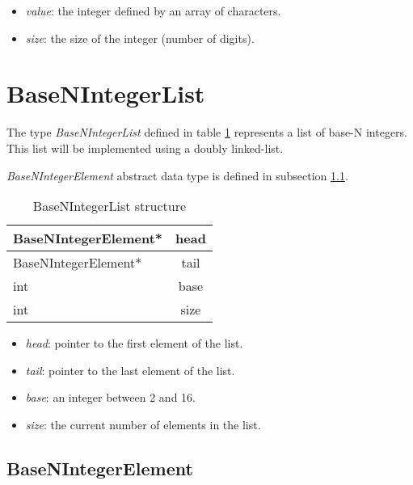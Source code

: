 \documentclass[book, nodocumentinfo]{upmethodology-document}
\begin{document}
\begin{itemize}
    \item \emph{value}: the integer defined by an array of characters.
    \item \emph{size}: the size of the integer (number of digits).
\end{itemize}

\section{BaseNIntegerList} \label{section:basen-integer-list}

The type \emph{BaseNIntegerList} defined in table \ref{tab:basenintegerlist-struct} represents a list of base-N integers.
This list will be implemented using a doubly linked-list.

\emph{BaseNIntegerElement} abstract data type is defined in subsection \ref{subsection:basen-integer-element}.

\begin{table}[h]
    \centering

    \begin{tabular}{|l|c|}
        \hline
        BaseNIntegerElement* & head \\
        \hline
        BaseNIntegerElement* & tail \\
        \hline
        int & base \\
        \hline
        int & size \\
        \hline
    \end{tabular}

    \caption{BaseNIntegerList structure}
    \label{tab:basenintegerlist-struct}
\end{table}

\begin{itemize}
    \item \emph{head}: pointer to the first element of the list.
    \item \emph{tail}: pointer to the last element of the list.
    \item \emph{base}: an integer between 2 and 16.
    \item \emph{size}: the current number of elements in the list.
\end{itemize}

\subsection{BaseNIntegerElement} \label{subsection:basen-integer-element}
\end{document}
